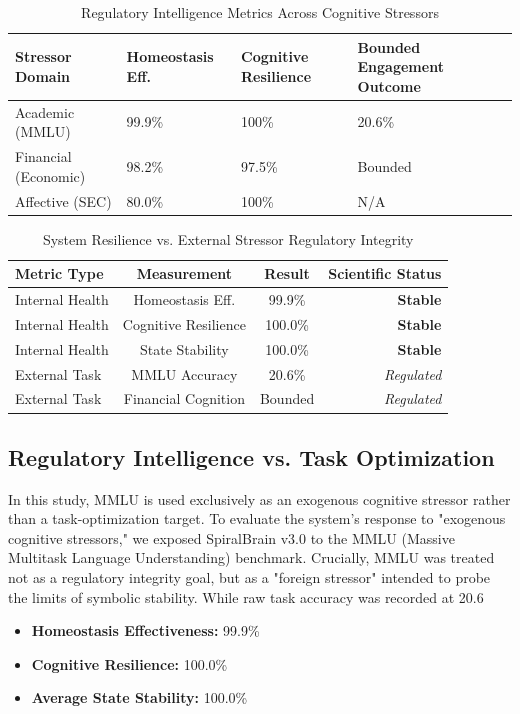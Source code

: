 \documentclass[11pt]{article}
\begin{document}
\begin{table}[htbp]
\centering
\captionsetup{justification=raggedright, singlelinecheck=false}
\caption{Regulatory Intelligence Metrics Across Cognitive Stressors}
\label{tab:regulatory_performance}

\begin{tabular}{@{}l
                p{3.2cm}
                p{2.2cm}
                p{2.5cm}@{}}
\toprule
\textbf{Stressor Domain} &
\textbf{Homeostasis Eff.} &
\textbf{Cognitive Resilience} &
\textbf{Bounded Engagement Outcome} \\
\midrule
Academic (MMLU)      & 99.9\% & 100\% & 20.6\% \\
Financial (Economic) & 98.2\% & 97.5\% & Bounded \\
Affective (SEC)      & 80.0\% & 100\% & N/A \\
\bottomrule
\end{tabular}
\end{table}


\begin{table}[htbp]
\centering
\caption{System Resilience vs. External Stressor Regulatory Integrity}
\begin{tabular}{lccr}
\toprule
\textbf{Metric Type} & \textbf{Measurement} & \textbf{Result} & \textbf{Scientific Status} \\
\midrule
Internal Health & Homeostasis Eff. & 99.9\% & \textbf{Stable} \\
Internal Health & Cognitive Resilience & 100.0\% & \textbf{Stable} \\
Internal Health & State Stability & 100.0\% & \textbf{Stable} \\
External Task & MMLU Accuracy & 20.6\% & \textit{Regulated} \\
External Task & Financial Cognition & Bounded & \textit{Regulated} \\
\bottomrule
\end{tabular}
\end{table}

\subsection{Regulatory Intelligence vs. Task Optimization}
In this study, MMLU is used exclusively as an exogenous cognitive stressor rather than a task-optimization target. To evaluate the system's response to "exogenous cognitive stressors," we exposed SpiralBrain v3.0 to the MMLU (Massive Multitask Language Understanding) benchmark. Crucially, MMLU was treated not as a regulatory integrity goal, but as a "foreign stressor" intended to probe the limits of symbolic stability.
While raw task accuracy was recorded at 20.6%
\begin{itemize}
    \item \textbf{Homeostasis Effectiveness:} 99.9\%
    \item \textbf{Cognitive Resilience:} 100.0\%
    \item \textbf{Average State Stability:} 100.0\%
\end{itemize}
\end{document}
